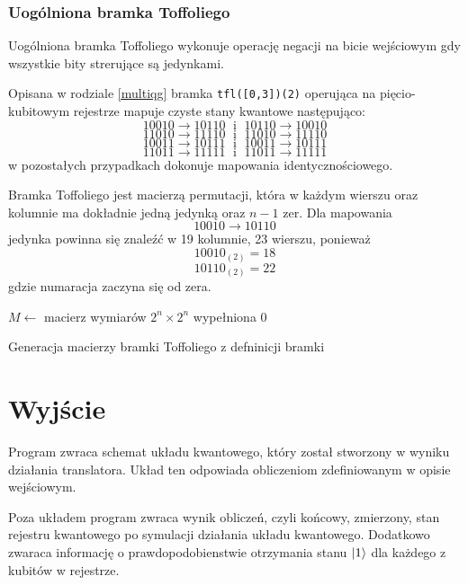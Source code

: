 \subsubsection{Uogólniona bramka Toffoliego}
Uogólniona bramka Toffoliego wykonuje operację negacji na bicie wejściowym gdy wszystkie bity strerujące są jedynkami.
\par Opisana w rodziale \ref{multiqg} bramka \texttt{tfl([0,3])(2)} operująca na pięcio-kubitowym rejestrze mapuje czyste stany kwantowe następująco:
\[10010  \rightarrow 10110\;\text{ i }\;10110  \rightarrow 10010\] %
\[11010  \rightarrow 11110\;\text{ i }\;11010  \rightarrow 11110\] %
\[10011  \rightarrow 10111\;\text{ i }\;10011  \rightarrow 10111\] %
\[11011  \rightarrow 11111\;\text{ i }\;11011  \rightarrow 11111\] %
w pozostałych przypadkach dokonuje mapowania identycznościowego.
\par Bramka Toffoliego jest macierzą permutacji, która w każdym wierszu oraz kolumnie ma dokładnie jedną jedynką oraz $n-1$ zer. Dla mapowania
\[10010  \rightarrow 10110\]
jedynka powinna się znaleźć w 19 kolumnie, 23 wierszu, ponieważ 
\[10010_{(2)} = 18\]
\[10110_{(2)} = 22\]
gdzie numaracja zaczyna się od zera.\\
\begin{pseudokod}[H]
    $M \leftarrow$ macierz wymiarów $2^n \times 2^n$ wypełniona 0\\
    \caption{Generacja macierzy bramki Toffoliego z defninicji bramki}\label{alg:toffoliGateGen}
\end{pseudokod}
\section{Wyjście}
Program zwraca schemat układu kwantowego, który został stworzony w wyniku działania translatora. Układ ten odpowiada obliczeniom zdefiniowanym w opisie wejściowym.
\par Poza układem program zwraca wynik obliczeń, czyli końcowy, zmierzony, stan rejestru kwantowego po symulacji działania układu kwantowego. Dodatkowo zwaraca informację o prawdopodobienstwie otrzymania stanu $\ket{1}$ dla każdego z kubitów w rejestrze.